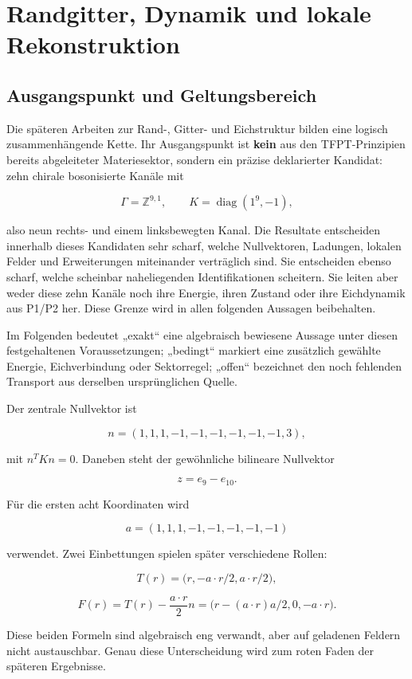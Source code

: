 \chapter{Randgitter, Dynamik und lokale Rekonstruktion}

\section{Ausgangspunkt und Geltungsbereich}

Die späteren Arbeiten zur Rand-, Gitter- und Eichstruktur bilden eine logisch zusammenhängende Kette. Ihr Ausgangspunkt ist \textbf{kein} aus den TFPT-Prinzipien bereits abgeleiteter Materiesektor, sondern ein präzise deklarierter Kandidat: zehn chirale bosonisierte Kanäle mit

\[
\Gamma=\mathbb Z^{9,1},\qquad K=\operatorname{diag}(1^9,-1),
\]

also neun rechts- und einem linksbewegten Kanal. Die Resultate entscheiden innerhalb dieses Kandidaten sehr scharf, welche Nullvektoren, Ladungen, lokalen Felder und Erweiterungen miteinander verträglich sind. Sie entscheiden ebenso scharf, welche scheinbar naheliegenden Identifikationen scheitern. Sie leiten aber weder diese zehn Kanäle noch ihre Energie, ihren Zustand oder ihre Eichdynamik aus P1/P2 her. Diese Grenze wird in allen folgenden Aussagen beibehalten.

Im Folgenden bedeutet „exakt“ eine algebraisch bewiesene Aussage unter diesen festgehaltenen Voraussetzungen; „bedingt“ markiert eine zusätzlich gewählte Energie, Eichverbindung oder Sektorregel; „offen“ bezeichnet den noch fehlenden Transport aus derselben ursprünglichen Quelle.

Der zentrale Nullvektor ist

\[
n=(1,1,1,-1,-1,-1,-1,-1,-1,3),
\]

mit \(n^TKn=0\). Daneben steht der gewöhnliche bilineare Nullvektor

\[
z=e_9-e_{10}.
\]

Für die ersten acht Koordinaten wird

\[
a=(1,1,1,-1,-1,-1,-1,-1)
\]

verwendet. Zwei Einbettungen spielen später verschiedene Rollen:

\[
T(r)=\bigl(r,-a\!\cdot\!r/2,a\!\cdot\!r/2\bigr),
\]

\[
F(r)=T(r)-\frac{a\!\cdot\!r}{2}n
=\bigl(r-(a\!\cdot\!r)a/2,0,-a\!\cdot\!r\bigr).
\]

Diese beiden Formeln sind algebraisch eng verwandt, aber auf geladenen Feldern nicht austauschbar. Genau diese Unterscheidung wird zum roten Faden der späteren Ergebnisse.

